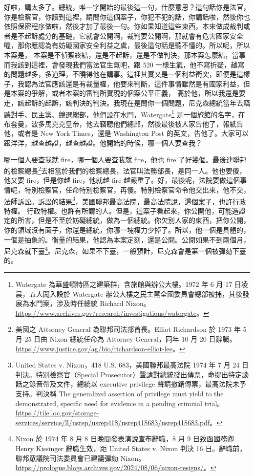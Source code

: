 \hypertarget{c11:cue:225}{}好啦，講太多了。總統，唯一字開始的最後這一句，什麼意思？這句話你是法官，你是檢察官，你讀到這裡，請問你這個案子，你犯不犯的話，你講話啦，然後你也依照保密程序做啦，然後才加了最後一句。你如果知道這些東西，本來做成裁判或者是不起訴處分的基礎，它就會公開啊，裁判要公開啊，那就會有危害國家安全喔，那你應認為有妨礙國家安全利益之虞，最後這句話是聽不懂的。所以呢，所以本案是，
\hypertarget{c11:cue:226}{}本案是不偵察終結，還是不起訴，還是不做判決，那本案怎麼結，當事而我該到這裡，會發現我們當法官生氣吧，跟 520 一樣生氣，他不寫折疑，越寫的問題越多，多道理，不曉得他在講事。這裡其實又是一個利益衝突，即便是這樣子，我認為法官應該還是有裁量權，他要來判斷，這件事情雖然是有國家利益，但是本案的爭解，或者本案的審判所實現的個案公平正義，
\hypertarget{c11:cue:227}{}高於他，所以我還是要走，該起訴的起訴，該判決的判決。我現在是問你一個問題，尼克森總統當年去竊聽對手、民主黨、競選總部，他們設在水門，Watergate\footnote{Watergate 為華盛頓特區之建築群，含旅館與辦公大樓。1972 年 6 月 17 日凌晨，五人闖入設於 Watergate 辦公大樓之民主黨全國委員會總部被捕，其後發展為水門案，涉及時任總統 Richard Nixon。\url{https://www.archives.gov/research/investigations/watergate}。} 是一個旅館的名字，在布套曼，波多馬克克皇帝，他去竊聽他們總部，然後最後被人家告他了，報紙告他，或者是 New York Times，還是 Washington Post 的英文，告他了。大家可以跟洋洋，越查越證，越查越證。他開始的時候，哪一個人要查我？

\hypertarget{c11:cue:228}{}哪一個人要查我就 fire，哪一個人要查我就 fire，他也 fire 了好幾個。最後連聯邦的檢察總長\footnote{美國之 Attorney General 為聯邦司法部首長。Elliot Richardson 於 1973 年 5 月 25 日由 Nixon 總統任命為 Attorney General，同年 10 月 20 日辭職。\url{https://www.justice.gov/ag/bio/richardson-elliot-lee}。}去相當於我們的檢察總長，法官叫法務部長，是同一人。他也要傻，他又要 fire，但是你越 fire，他就越 fire 越嚴重了。好，最後呢，法院要做這個事情呢，特別檢察官，任命特別檢察官，再傻。特別檢察官命令他交出來，他不交，法師訴訟。訴訟的結果\footnote{United States v. Nixon，418 U.S. 683，美國聯邦最高法院 1974 年 7 月 24 日判決。特別檢察官（Special Prosecutor）聲請對總統發出傳票，命提出特定談話之錄音帶及文件，總統以 executive privilege 聲請撤銷傳票，最高法院未予支持。判決稱 The generalized assertion of privilege must yield to the demonstrated, specific need for evidence in a pending criminal trial。\url{https://tile.loc.gov/storage-services/service/ll/usrep/usrep418/usrep418683/usrep418683.pdf}。}，美國聯邦最高法院，最高法院說，這個案子，也許行政特權。
\hypertarget{c11:cue:229}{}行政特權。也許有所謂的人。但是，這案子看起來，你公開他，可能造證定的所害，但是不至於妨礙總統，做為一個總統。你欠別人家的東西，把你公開，你的領域沒有面子，你還是總統，你哪一塊權力少掉了。所以，他一個是具體的，一個是抽象的。衡量的結果，他認為本案定刻，還是公開。公開如果不到兩個月，尼克森就下臺\footnote{Nixon 於 1974 年 8 月 8 日晚間發表演說宣布辭職，8 月 9 日致函國務卿 Henry Kissinger 辭職生效，距 United States v. Nixon 判決 16 日。辭職前，聯邦眾議院司法委員會已建議彈劾 Nixon。\url{https://prologue.blogs.archives.gov/2024/08/06/nixon-resigns/}。}。尼克森，如果不下臺，一般預計，尼克森會是第一個被彈劾下臺的。

